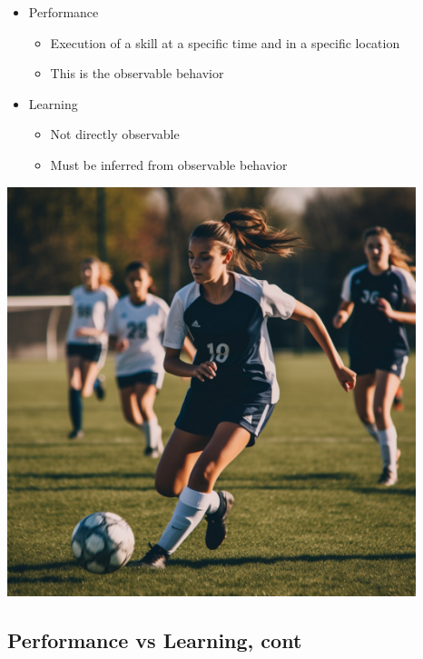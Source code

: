 \documentclass[
  letterpaper,
  DIV=11,
  numbers=noendperiod]{scrartcl}
\providecommand{\tightlist}{%
  \setlength{\itemsep}{0pt}\setlength{\parskip}{0pt}}\usepackage{longtable,booktabs,array}
\begin{document}
\begin{itemize}
\tightlist
\item
  Performance

  \begin{itemize}
  \tightlist
  \item
    Execution of a skill at a specific time and in a specific
    location\hspace{0pt}
  \item
    This is the observable behavior\hspace{0pt}
  \end{itemize}
\item
  Learning\hspace{0pt}

  \begin{itemize}
  \tightlist
  \item
    Not directly observable\hspace{0pt}
  \item
    Must be inferred from observable behavior\hspace{0pt}
  \end{itemize}
\end{itemize}

\includegraphics[width=4.6875in,height=\textheight]{ma-ch11_files/mediabag/drfurtado_a_girl_hea.png}

\hypertarget{performance-vs-learning-cont}{%
\subsection{Performance vs Learning,
cont}\label{performance-vs-learning-cont}}
\end{document}
